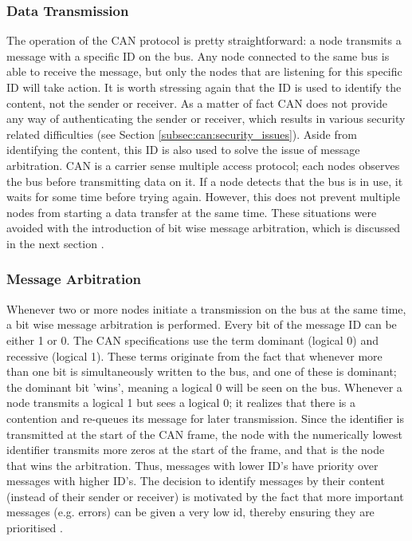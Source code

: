 \subsubsection{Data Transmission}
\label{subsec:can:data_transmission}

The operation of the CAN protocol is pretty straightforward: a node transmits a message with a specific ID on the bus. Any node connected to the same bus is able to receive the message, but only the nodes that are listening for this specific ID will take action. It is worth stressing again that the ID is used to identify the content, not the sender or receiver. As a matter of fact CAN does not provide any way of authenticating the sender or receiver, which results in various security related difficulties (see Section \ref{subsec:can:security_issues}). Aside from identifying the content, this ID is also used to solve the issue of message arbitration. CAN is a carrier sense multiple access protocol; each nodes observes the bus before transmitting data on it. If a node detects that the bus is in use, it waits for some time before trying again. However, this does not prevent multiple nodes from starting a data transfer at the same time. These situations were avoided with the introduction of bit wise message arbitration, which is discussed in the next section \cite{CANarbitration}.

\subsubsection{Message Arbitration}
\label{subsec:can:message_arbitration}

Whenever two or more nodes initiate a transmission on the bus at the same time, a bit wise message arbitration is performed. Every bit of the message ID can be either 1 or 0. The CAN specifications use the term dominant (logical 0) and recessive (logical 1). These terms originate from the fact that whenever more than one bit is simultaneously written to the bus, and one of these is dominant; the dominant bit 'wins', meaning a logical 0 will be seen on the bus. Whenever a node transmits a logical 1 but sees a logical 0; it realizes that there is a contention and re-queues its message for later transmission. Since the identifier is transmitted at the start of the CAN frame, the node with the numerically lowest identifier transmits more zeros at the start of the frame, and that is the node that wins the arbitration. Thus, messages with lower ID's have priority over messages with higher ID's. The decision to identify messages by their content (instead of their sender or receiver) is motivated by the fact that more important messages (e.g. errors) can be given a very low id, thereby ensuring they are prioritised \cite{ISO11898-2,ISO11898-3}. 

